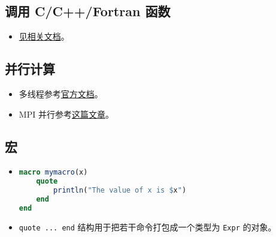 \subsection{调用 C/C++/Fortran 函数}
\begin{itemize}
\item \href{https://docs.julialang.org/en/v1/manual/calling-c-and-fortran-code/}{见相关文档}。
\end{itemize}

\subsection{并行计算}
\begin{itemize}
\item 多线程参考\href{https://docs.julialang.org/en/v1/manual/multi-threading/}{官方文档}。
\item MPI 并行参考\href{http://www.claudiobellei.com/2018/09/30/julia-mpi/}{这篇文章}。
\end{itemize}

\subsection{宏}
\begin{itemize}
\item 
\begin{lstlisting}[language=julia]
macro mymacro(x)
    quote
        println("The value of x is $x")
    end
end
\end{lstlisting}
\item \verb|quote ... end| 结构用于把若干命令打包成一个类型为 \verb|Expr| 的对象。
\end{itemize}
